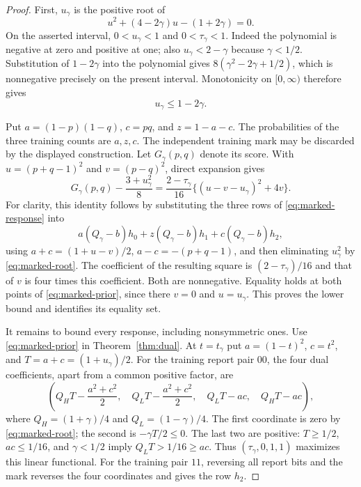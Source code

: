 \begin{proof}
First, $u_\gamma$ is the positive root of
\begin{equation}\label{eq:marked-root}
 u^2+(4-2\gamma)u-(1+2\gamma)=0.
\end{equation}
On the asserted interval, $0<u_\gamma<1$ and $0<\tau_\gamma<1$.
Indeed the polynomial is negative at zero and positive at one; also
$u_\gamma<2-\gamma$ because $\gamma<1/2$. Substitution of $1-2\gamma$
into the polynomial gives $8(\gamma^2-2\gamma+1/2)$, which is
nonnegative precisely on the present interval. Monotonicity on
$[0,\infty)$ therefore gives
\begin{equation}\label{eq:marked-range}
                    u_\gamma\le1-2\gamma.
\end{equation}

Put $a=(1-p)(1-q)$, $c=pq$, and $z=1-a-c$. The probabilities of the
three training counts are $a,z,c$. The independent training mark may
be discarded by the displayed construction. Let $G_\gamma(p,q)$ denote
its score. With $u=(p+q-1)^2$ and $v=(p-q)^2$, direct expansion gives
\begin{equation}\label{eq:marked-sos}
 G_\gamma(p,q)-\frac{3+u_\gamma^2}{8}
 =\frac{2-\tau_\gamma}{16}
       \big\{(u-v-u_\gamma)^2+4v\big\}.
\end{equation}
For clarity, this identity follows by substituting the three rows of
\eqref{eq:marked-response} into
\[
 a(Q_\gamma-b)h_0+z(Q_\gamma-b)h_1+c(Q_\gamma-b)h_2,
\]
using $a+c=(1+u-v)/2$, $a-c=-(p+q-1)$, and then eliminating
$u_\gamma^2$ by \eqref{eq:marked-root}. The coefficient of the resulting
square is $(2-\tau_\gamma)/16$ and that of $v$ is four times this
coefficient. Both are nonnegative. Equality holds at both points of
\eqref{eq:marked-prior}, since there $v=0$ and $u=u_\gamma$.
This proves the lower bound and identifies its equality set.

It remains to bound every response, including nonsymmetric ones. Use
\eqref{eq:marked-prior} in Theorem~\ref{thm:dual}. At $t=t_\gamma$ put
$a=(1-t)^2$, $c=t^2$, and $T=a+c=(1+u_\gamma)/2$. For the training
report pair $00$, the four dual coefficients, apart from a common
positive factor, are
\begin{equation}\label{eq:marked-coefficients}
 \left(Q_H T-\frac{a^2+c^2}{2},\quad
 Q_L T-\frac{a^2+c^2}{2},\quad Q_L T-ac,\quad Q_H T-ac\right),
\end{equation}
where $Q_H=(1+\gamma)/4$ and $Q_L=(1-\gamma)/4$.
The first coordinate is zero by \eqref{eq:marked-root}; the second
is $-\gamma T/2\le0$. The last two are positive: $T\ge1/2$,
$ac\le1/16$, and $\gamma<1/2$ imply $Q_LT>1/16\ge ac$.
Thus $(\tau_\gamma,0,1,1)$ maximizes this linear functional.
For the training pair $11$, reversing all report bits and the mark
reverses the four coordinates and gives the row $h_2$.


\end{proof}
